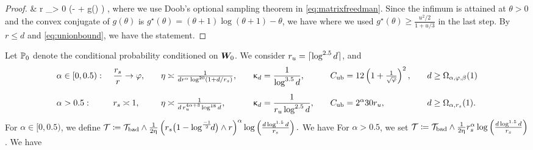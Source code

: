 \begin{proof}
{& \Rightarrow r \inf_{\theta > 0}  \exp \left(- \theta  {}+ g(\theta)    \right)  \geq \mpr {}, 
}
where we use Doob's optional sampling theorem in \eqref{eq:matrixfreedman}.  Since the infimum is attained at $\theta > 0$ and the convex conjugate of $g(\theta)$ is $g^\star(\theta) = (\theta +1) \log(\theta +1) -  \theta$, we have
where we used  $g^\star(\theta) \geq \frac{u^2/2}{1 + u/3}$ in the last step. By $r \leq d$ and  \eqref{eq:unionbound}, we have the statement.
\end{proof}

 
\begin{proposition}
\label{prop:Tbadboundaux}
Let  $\mathbb{P}_0$ denote the conditional probability conditioned on $\boldsymbol{W}_0$. We consider  $r_u = \lceil\log^{2.5} d\rceil$,  and
\begin{alignat}{6}
&\alpha \in [0, 0.5): ~
&& \frac{r_s}{r} \to \varphi,  \quad  
&&  \eta \asymp \tfrac{1}{d r^{\alpha} \log^{20}(1+ d/r_s)},  \quad  
&&  \upkappa_d = \frac{1}{\log^{3.5} d}, \quad
&& C_{\text{ub}} = 12 \left( 1 + \tfrac{1}{\sqrt{\varphi}} \right)^2, \quad
&& d \geq \Omega_{\alpha, \varphi, \beta}(1)  \\[0.5em]
& \alpha > 0.5: ~
&& r_s  \asymp 1, \quad  
&&\eta \asymp \tfrac{1}{d\,  r_u^{4 \alpha + 3} \log^{18} d}, \quad  
&& \upkappa_d = \frac{1}{r_u \log^{2.5} d}, \quad
&& C_{\text{ub}} = 2^{\alpha} 30 r_u , \quad
&&  d\geq \Omega_{\alpha, r_s}(1). 
\end{alignat}
For $\alpha \in [0, 0.5)$,  we define $\mathcal{T} \coloneqq  \mathcal{T}_{\text{bad}} \wedge \frac{1}{2\upeta}  \left( r_s   \big(1 -  \log^{\frac{- 1}{2}} \!\! d   \big) \wedge r \right)^{\alpha}   \log \left( \frac{d\log^{1.5} d}{r_s} \right).$ We have
For $\alpha> 0.5$, we set $\mathcal{T} \coloneqq  \mathcal{T}_{\text{bad}} \wedge \frac{1}{2\upeta}  r_s^{\alpha}   \log \left( \frac{d\log^{1.5} d}{r_s} \right)$. We have
 \end{proposition}
 
